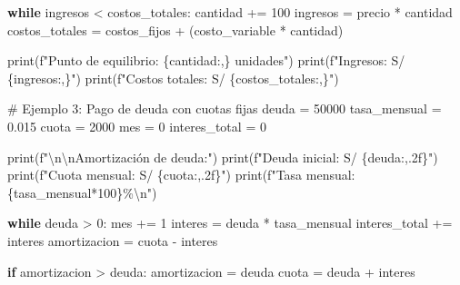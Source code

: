 \documentclass[
  doc,
  floatsintext,
  longtable,
  a4paper,
  nolmodern,
  notxfonts,
  notimes,
  12pt,
  colorlinks=true,linkcolor=blue,citecolor=blue,urlcolor=blue]{apa7}
\newenvironment{Shaded}{\begin{snugshade}}{\end{snugshade}}
\newcommand{\BuiltInTok}[1]{\textcolor[rgb]{0.00,0.23,0.31}{#1}}
\newcommand{\CharTok}[1]{\textcolor[rgb]{0.13,0.47,0.30}{#1}}
\newcommand{\CommentTok}[1]{\textcolor[rgb]{0.37,0.37,0.37}{#1}}
\newcommand{\ControlFlowTok}[1]{\textcolor[rgb]{0.00,0.23,0.31}{\textbf{#1}}}
\newcommand{\DecValTok}[1]{\textcolor[rgb]{0.68,0.00,0.00}{#1}}
\newcommand{\FloatTok}[1]{\textcolor[rgb]{0.68,0.00,0.00}{#1}}
\newcommand{\NormalTok}[1]{\textcolor[rgb]{0.00,0.23,0.31}{#1}}
\newcommand{\OperatorTok}[1]{\textcolor[rgb]{0.37,0.37,0.37}{#1}}
\newcommand{\SpecialCharTok}[1]{\textcolor[rgb]{0.37,0.37,0.37}{#1}}
\newcommand{\SpecialStringTok}[1]{\textcolor[rgb]{0.13,0.47,0.30}{#1}}
\begin{document}
\begin{Shaded}
\begin{Highlighting}[]
\ControlFlowTok{while}\NormalTok{ ingresos }\OperatorTok{\textless{}}\NormalTok{ costos\_totales:}
\NormalTok{    cantidad }\OperatorTok{+=} \DecValTok{100}
\NormalTok{    ingresos }\OperatorTok{=}\NormalTok{ precio }\OperatorTok{*}\NormalTok{ cantidad}
\NormalTok{    costos\_totales }\OperatorTok{=}\NormalTok{ costos\_fijos }\OperatorTok{+}\NormalTok{ (costo\_variable }\OperatorTok{*}\NormalTok{ cantidad)}

\BuiltInTok{print}\NormalTok{(}\SpecialStringTok{f"Punto de equilibrio: }\SpecialCharTok{\{}\NormalTok{cantidad}\SpecialCharTok{:,\}}\SpecialStringTok{ unidades"}\NormalTok{)}
\BuiltInTok{print}\NormalTok{(}\SpecialStringTok{f"Ingresos: S/ }\SpecialCharTok{\{}\NormalTok{ingresos}\SpecialCharTok{:,\}}\SpecialStringTok{"}\NormalTok{)}
\BuiltInTok{print}\NormalTok{(}\SpecialStringTok{f"Costos totales: S/ }\SpecialCharTok{\{}\NormalTok{costos\_totales}\SpecialCharTok{:,\}}\SpecialStringTok{"}\NormalTok{)}

\CommentTok{\# Ejemplo 3: Pago de deuda con cuotas fijas}
\NormalTok{deuda }\OperatorTok{=} \DecValTok{50000}
\NormalTok{tasa\_mensual }\OperatorTok{=} \FloatTok{0.015}
\NormalTok{cuota }\OperatorTok{=} \DecValTok{2000}
\NormalTok{mes }\OperatorTok{=} \DecValTok{0}
\NormalTok{interes\_total }\OperatorTok{=} \DecValTok{0}

\BuiltInTok{print}\NormalTok{(}\SpecialStringTok{f"}\CharTok{\textbackslash{}n\textbackslash{}n}\SpecialStringTok{Amortización de deuda:"}\NormalTok{)}
\BuiltInTok{print}\NormalTok{(}\SpecialStringTok{f"Deuda inicial: S/ }\SpecialCharTok{\{}\NormalTok{deuda}\SpecialCharTok{:,.2f\}}\SpecialStringTok{"}\NormalTok{)}
\BuiltInTok{print}\NormalTok{(}\SpecialStringTok{f"Cuota mensual: S/ }\SpecialCharTok{\{}\NormalTok{cuota}\SpecialCharTok{:,.2f\}}\SpecialStringTok{"}\NormalTok{)}
\BuiltInTok{print}\NormalTok{(}\SpecialStringTok{f"Tasa mensual: }\SpecialCharTok{\{}\NormalTok{tasa\_mensual}\OperatorTok{*}\DecValTok{100}\SpecialCharTok{\}}\SpecialStringTok{\%}\CharTok{\textbackslash{}n}\SpecialStringTok{"}\NormalTok{)}

\ControlFlowTok{while}\NormalTok{ deuda }\OperatorTok{\textgreater{}} \DecValTok{0}\NormalTok{:}
\NormalTok{    mes }\OperatorTok{+=} \DecValTok{1}
\NormalTok{    interes }\OperatorTok{=}\NormalTok{ deuda }\OperatorTok{*}\NormalTok{ tasa\_mensual}
\NormalTok{    interes\_total }\OperatorTok{+=}\NormalTok{ interes}
\NormalTok{    amortizacion }\OperatorTok{=}\NormalTok{ cuota }\OperatorTok{{-}}\NormalTok{ interes}
    
    \ControlFlowTok{if}\NormalTok{ amortizacion }\OperatorTok{\textgreater{}}\NormalTok{ deuda:}
\NormalTok{        amortizacion }\OperatorTok{=}\NormalTok{ deuda}
\NormalTok{        cuota }\OperatorTok{=}\NormalTok{ deuda }\OperatorTok{+}\NormalTok{ interes}
    

\end{Highlighting}
\end{Shaded}
\end{document}
